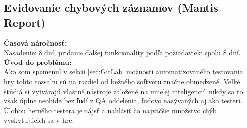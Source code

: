 \documentclass[slovak, bachelorpractice]{diploma}
\begin{document}
\subsection{Evidovanie chybových záznamov (Mantis Report)}
\label{sec:Report}
\textbf{Časová náročnosť:} \\ Nasadenie: 8 dní, pridanie ďalšej funkcionality podľa požiadaviek: spolu 8 dní.\\
\textbf{Úvod do problému:} \\ Ako som spomenul v sekcií \ref{sec:GitLab} možnosti automatizovaného testovania hry tohto rozsahu sú na rozdiel od bežného softvéru značne obmedzené. Veľké štúdiá si vytvárajú vlastné nástroje založené na umelej inteligencií, nikdy sa to však úplne neobíde bez ľudí z QA oddelenia, ľudovo nazývaných aj ako testeri. Úlohou herného testera je nájsť a nahlásiť čo najväčšie množstvo chýb vyskytujúcich sa v hre. 
\end{document}
